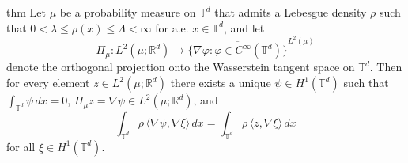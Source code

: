 \documentclass[11pt]{article}
\begin{document}
\begin{restatable}{thm}{} \label{projection realization}
    Let $\mu$ be a probability measure on $\mathbb{T}^d$ that admits a Lebesgue density $\rho$ such that $0 < \lambda \leq \rho(x) \leq \Lambda < \infty$ for a.e. $x \in \mathbb{T}^d$, and let 
    \[\Pi_\mu: 
     L^2(\mu; \mathbb{R}^d)\longrightarrow \overline{\{\nabla\varphi:\varphi\in C^\infty(\mathbb T^d)\}}^{L^2(\mu)}\]
     denote the orthogonal projection onto the Wasserstein tangent space on $\mathbb{T}^d$. Then for every element $z \in L^2(\mu; \mathbb{R}^d)$ there exists a unique $\psi \in H^1(\mathbb{T}^d)$ such that $\int_{\mathbb{T}^d} \psi\, dx = 0$, $\Pi_\mu z = \nabla \psi \in L^2(\mu; \mathbb{R}^d)$, and 
     \[\int_{\mathbb{T}^d}\rho \,\langle \nabla \psi , \nabla \xi  \rangle\, dx = \int_{\mathbb{T}^d}\rho \, \langle z, \nabla \xi \rangle\, dx \]
     for all $\xi \in H^1(\mathbb{T}^d).$
\end{restatable}
\end{document}
